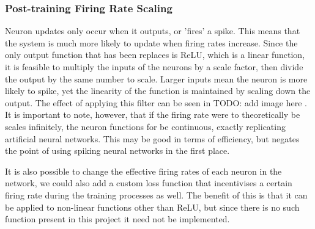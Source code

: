 \subsubsection{Post-training Firing Rate Scaling}

Neuron updates only occur when it outputs, or 'fires' a spike. This means that the system is much more likely to update when firing rates increase. Since the only output function that has been replaces is ReLU, which is a linear function, it is feasible to multiply the inputs of the neurons by a scale factor, then divide the output by the same number to scale. Larger inputs mean the neuron is more likely to spike, yet the linearity of the function is maintained by scaling down the output. The effect of applying this filter can be seen in \color{red} TODO: add image here \color{black}. It is important to note, however, that if the firing rate were to theoretically be scales infinitely, the neuron functions for be continuous, exactly replicating artificial neural networks. This may be good in terms of efficiency, but negates the point of using spiking neural networks in the first place.

It is also possible to change the effective firing rates of each neuron in the network, we could also add a custom loss function that incentivises a certain firing rate during the training processes as well. The benefit of this is that it can be applied to non-linear functions other than ReLU, but since there is no such function present in this project it need not be implemented.